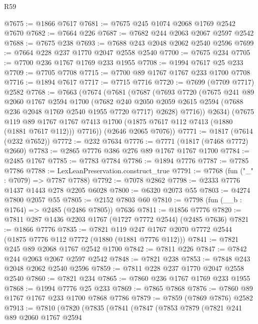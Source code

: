 \begin{lexlean}{R59}
\begin{coremodule}
@7675 := @1866 @7617
@7681 := @7675 @245 @1074 @2068 @1769 @2542 @7670
@7682 := @7664 @226
@7687 := @7682 @244 @2063 @2067 @2597 @2542
@7688 := @7675 @238
@7693 := @7688 @243 @2048 @2062 @2540 @2596
@7699 := @7664 @228 @237 @1770 @2047 @2558 @2540
@7700 := @7675 @234
@7705 := @7700 @236 @1767 @1769 @233 @1955
@7708 := @1994 @7617 @25 @233
@7709 := @7705 @7708
@7715 := @7700 @89 @1767 @1767 @233 @1700 @7708
@7716 := @1894 @7617
@7717 := @7715 @7716
@7720 := @7699 (@7709 @7717) @2582
@7768 := @7663
    (@7674
      (@7681
        (@7687
          (@7693
            @7720
            (@7675
              @241
              @89
              @2060
              @1767
              @2594
              @1700
              (@7682
                @240
                @2050
                @2059
                @2615
                @2594
                (@7688 @236 @2048 @1769 @2540 @1955 @7720 @7717)
                @2628)
              @7716))
          @2634)
        (@7675
          @119
          @89
          @1767
          @1767
          @7413
          @1700
          (@1875 @7617 @112 @7413 (@1880 (@1881 @7617 @112)))
          @7716))
      (@2646 @2065 @7076))
@7771 := @1817 (@7614 (@232 @7652))
@7772 := @232 @7634
@7776 := @7771 (@1817 (@7468 @7772) @2660)
@7783 := @2865 @7776 @386 @276 @89 @1767 @1767 @1700
@7784 := @2485 @1767
@7785 := @7783 @7784
@7786 := @1894 @7776
@7787 := @7785 @7786
@7788 := LexLeanPreservation.construct_true
@7791 := @7768 (fun ("_" : @7079) => @7787 @7788)
@7792 := @7078 @2862
@7798 := @2333 @7776 @1437 @1443 @278 @2205 @6028
@7800 := @6320 @2073 @55
@7803 := @4274 @7800 @2057 @55
@7805 := @2152 @7803 @60
@7810 := @7798 (fun (__b : @1764) => @2485 (@2486 @7805)) @7636
@7811 := @1856 @7776
@7820 := @7811 @287 @1436 @2203 @1767 (@1727 @7772 @2544) (@2485 @7636)
@7821 := @1866 @7776
@7835 := @7821 @119 @247 @1767 @2070 @7772 @2544 (@1875 @7776 @112 @7772 (@1880 (@1881 @7776 @112)))
@7841 := @7821 @245 @89 @2068 @1767 @2542 @1700
@7842 := @7811 @226
@7847 := @7842 @244 @2063 @2067 @2597 @2542
@7848 := @7821 @238
@7853 := @7848 @243 @2048 @2062 @2540 @2596
@7859 := @7811 @228 @237 @1770 @2047 @2558 @2540
@7860 := @7821 @234
@7865 := @7860 @236 @1767 @1769 @233 @1955
@7868 := @1994 @7776 @25 @233
@7869 := @7865 @7868
@7876 := @7860 @89 @1767 @1767 @233 @1700 @7868 @7786
@7879 := @7859 (@7869 @7876) @2582
@7913 := @7810
    (@7820
      (@7835
        (@7841
          (@7847
            (@7853
              @7879
              (@7821
                @241
                @89
                @2060
                @1767
                @2594

\end{coremodule}
\end{lexlean}
